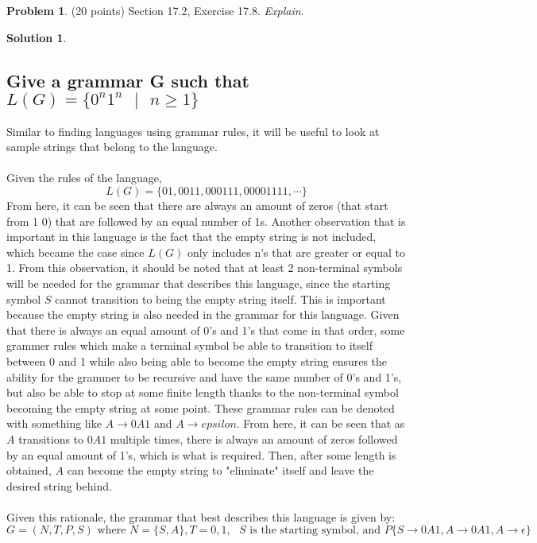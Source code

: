 \documentclass{article}
\theoremstyle{definition}
\newtheorem{problem}{Problem}
\newtheorem*{solution}{Solution}
\begin{document}
\newpage
\begin{problem} (20 points) Section 17.2, Exercise 17.8.  \textit{Explain}.
\end{problem}
\begin{solution}
\hspace{1cm}
\subsection*{Give a grammar G such that $L(G) = \{0^n1^n \mbox{ }|\mbox{ } n \geqslant 1\}$}
Similar to finding languages using grammar rules, it will be useful to look at sample strings that belong to the language.\\\\
Given the rules of the language,
$$ L(G) = \{01,0011,000111,00001111,\cdots \} $$
From here, it can be seen that there are always an amount of zeros (that start from 1 0) that are followed by an equal number of 1s. Another observation that is important in this language is the fact that the empty string is not included, which became the case since $L(G)$ only includes n's that are greater or equal to 1. From this observation, it should be noted that at least 2 non-terminal symbols will be needed for the grammar that describes this language, since the starting symbol $S$ cannot transition to being the empty string itself. This is important because the empty string is also needed in the grammar for this language. Given that there is always an equal amount of 0's and 1's that come in that order, some grammer rules which make a terminal symbol be able to transition to itself between 0 and 1 while also being able to become the empty string ensures the ability for the grammer to be recursive and have the same number of 0's and 1's, but also be able to stop at some finite length thanks to the non-terminal symbol becoming the empty string at some point. These grammar rules can be denoted with something like $A \rightarrow 0A1$ and $A \rightarrow epsilon$. From here, it can be seen that as $A$ transitions to $0A1$ multiple times, there is always an amount of zeros followed by an equal amount of 1's, which is what is required. Then, after some length is obtained, $A$ can become the empty string to "eliminate" itself and leave the desired string behind.\\\\
Given this rationale, the grammar that best describes this language is given by:
$$ G = (N,T,P,S) \mbox{ where } N = \{S,A\}, T ={0,1}, \mbox{ $S$ is the starting symbol, and } P\{S \rightarrow 0A1, A \rightarrow 0A1, A \rightarrow \epsilon \} $$
\end{solution}
\end{document}
